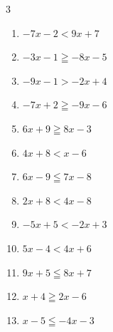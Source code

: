 \begin{multicols}{3}
\begin{enumerate}
        \phantom{$\displaystyle x\geqq -7$}

  \item $-7x-2<9x+7$


\columnbreak %

\resetques

  \item $-3x-1\geqq -8x-5$


  \item $-9x-1>-2x+4$


  \item $-7x+2\geqq -9x-6$

        \phantom{$\displaystyle x\geqq -4$}

  \item $6x+9\geqq 8x-3$

        \phantom{$\displaystyle x\leqq 6$}

  \item $4x+8<x-6$


  \item $6x-9\leqq 7x-8$

        \phantom{$\displaystyle x\geqq -1$}

  \item $2x+8<4x-8$

        \phantom{$\displaystyle x>8$}

  \item $-5x+5<-2x+3$


  \item $5x-4<4x+6$

        \phantom{$\displaystyle x<10$}

  \item $9x+5\leqq 8x+7$

        \phantom{$\displaystyle x\leqq 2$}

  \item $x+4\geqq 2x-6$

        \phantom{$\displaystyle x\leqq 10$}

  \item $x-5\leqq -4x-3$



\end{enumerate}
\end{multicols}
